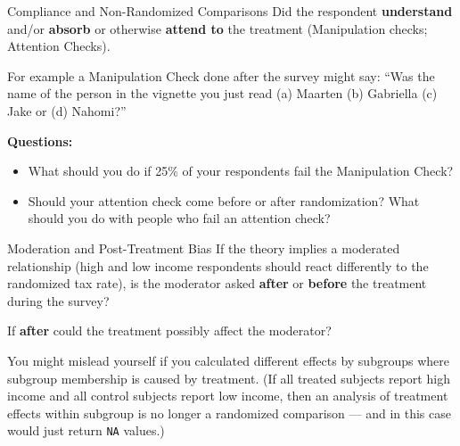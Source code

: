 \documentclass[
  ignorenonframetext,
]{beamer}
\begin{document}
\begin{frame}{Compliance and Non-Randomized Comparisons}
\protect\hypertarget{compliance-and-non-randomized-comparisons-1}{}
Did the respondent \textbf{understand} and/or \textbf{absorb} or
otherwise \textbf{attend to} the treatment (Manipulation checks;
Attention Checks).

For example a Manipulation Check done after the survey might say: ``Was
the name of the person in the vignette you just read (a) Maarten (b)
Gabriella (c) Jake or (d) Nahomi?''

\textbf{Questions:}

\begin{itemize}
\item
  What should you do if 25\% of your respondents fail the Manipulation
  Check?
\item
  Should your attention check come before or after randomization? What
  should you do with people who fail an attention check?
\end{itemize}
\end{frame}

\begin{frame}[fragile]{Moderation and Post-Treatment Bias}
\protect\hypertarget{moderation-and-post-treatment-bias}{}
If the theory implies a moderated relationship (high and low income
respondents should react differently to the randomized tax rate), is the
moderator asked \textbf{after} or \textbf{before} the treatment during
the survey?

If \textbf{after} could the treatment possibly affect the moderator?

You might mislead yourself if you calculated different effects by
subgroups where subgroup membership is caused by treatment. (If all
treated subjects report high income and all control subjects report low
income, then an analysis of treatment effects within subgroup is no
longer a randomized comparison --- and in this case would just return
\texttt{NA} values.)
\end{frame}
\end{document}
